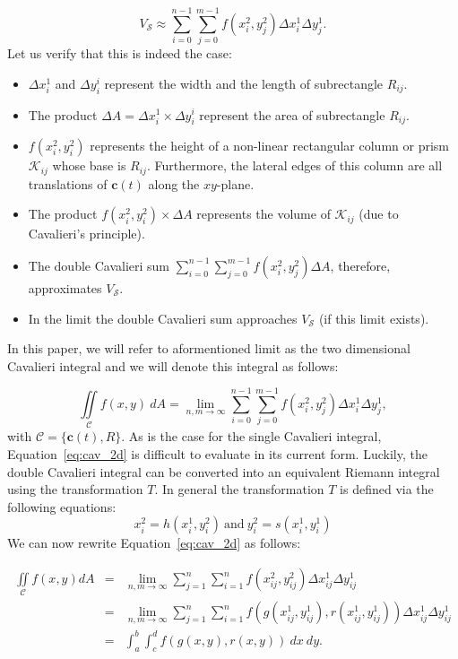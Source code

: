 \documentclass{article}
\theoremstyle{theorem}
\theoremstyle{definition}
\begin{document}
\begin{equation}
V_{\mathcal{S}} \approx \sum_{i=0}^{n-1} \sum_{j=0}^{m-1} f(x_i^2,y_j^2) \Delta x_i^1 \Delta y_j^1.
\end{equation}
Let us verify that this is indeed the case:
\begin{itemize}
\item $\Delta x_i^1$ and $\Delta y_i^i$ represent the width and the length of subrectangle $R_{ij}$.
\item The product $\Delta A = \Delta x_i^1\times \Delta y_i^i$ represent the area of subrectangle $R_{ij}$.
\item $f(x_i^2,y_i^2)$ represents the height of a non-linear rectangular column or prism $\mathcal{K}_{ij}$ whose base is $R_{ij}$. Furthermore, the lateral edges of this column are all translations 
of $\mathbf{c}(t)$ along the $xy$-plane. 
\item The product $f(x_i^2,y_i^2)\times \Delta A$ represents the volume of $\mathcal{K}_{ij}$ (due to Cavalieri's principle).
\item The double Cavalieri sum $\sum_{i=0}^{n-1} \sum_{j=0}^{m-1} f(x_i^2,y_j^2) \Delta A$, therefore, approximates $V_{\mathcal{S}}$. 
\item In the limit the double Cavalieri sum approaches $V_{\mathcal{S}}$ (if this limit exists). 
\end{itemize}

In this paper, we will refer to aformentioned limit as the two dimensional Cavalieri integral and we will denote this integral as follows:

\begin{equation}
\label{eq:cav_2d}
\iint \limits_{\mathcal{C}} f(x,y)~dA = \lim_{n,m \rightarrow \infty}  \sum_{i=0}^{n-1} \sum_{j=0}^{m-1} f(x_i^2,y_j^2) \Delta x_i^1 \Delta y_j^1,
\end{equation}
with $\mathcal{C} = \{\mathbf{c}(t),R\}$. As is the case for the single Cavalieri integral, Equation~\eqref{eq:cav_2d} is difficult to evaluate in its current form. Luckily, the double 
Cavalieri integral can be converted into an equivalent Riemann integral using the transformation $T$. In general the transformation $T$ is defined via the following 
equations:
\begin{equation}
x_i^2 = h(x_i^1,y_i^2)~\textrm{and}~y_i^2 = s(x_i^1,y_i^1) 
\end{equation}
We can now rewrite Equation~\eqref{eq:cav_2d} as follows:

\begin{eqnarray}
\iint\limits_{\!\mathcal{C}} f(x,y) dA &=& \lim_{n,m\rightarrow \infty} \sum_{j=1}^n\sum_{i=1}^n f(x_{ij}^2,y_{ij}^2) \Delta x_{ij}^1\Delta y_{ij}^1\\
&=&  \lim_{n,m\rightarrow \infty} \sum_{j=1}^n\sum_{i=1}^n f(g(x_{ij}^1,y_{ij}^1),r(x_{ij}^1,y_{ij}^1)) \Delta x_{ij}^1\Delta y_{ij}^1\\
&=& \int_a^b\int_c^d f(g(x,y),r(x,y))~dx~dy.
\end{eqnarray}
\end{document}
